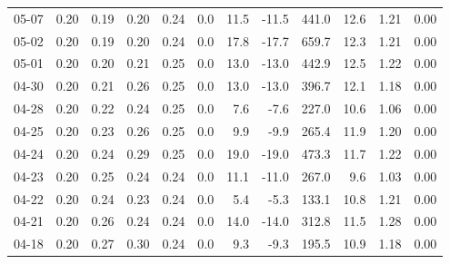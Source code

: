 \begin{threeparttable}
{\begin{tabular}{lrrrrrrrrrrr}
  05-07 &          0.20 &          0.19 &          0.20 &        0.24 &                 0.0 &                11.5 &      -11.5 &               441.0 &             12.6 &            1.21 &                   0.00 \\
  05-02 &          0.20 &          0.19 &          0.20 &        0.24 &                 0.0 &                17.8 &      -17.7 &               659.7 &             12.3 &            1.21 &                   0.00 \\
  05-01 &          0.20 &          0.20 &          0.21 &        0.25 &                 0.0 &                13.0 &      -13.0 &               442.9 &             12.5 &            1.22 &                   0.00 \\
  04-30 &          0.20 &          0.21 &          0.26 &        0.25 &                 0.0 &                13.0 &      -13.0 &               396.7 &             12.1 &            1.18 &                   0.00 \\
  04-28 &          0.20 &          0.22 &          0.24 &        0.25 &                 0.0 &                 7.6 &       -7.6 &               227.0 &             10.6 &            1.06 &                   0.00 \\
  04-25 &          0.20 &          0.23 &          0.26 &        0.25 &                 0.0 &                 9.9 &       -9.9 &               265.4 &             11.9 &            1.20 &                   0.00 \\
  04-24 &          0.20 &          0.24 &          0.29 &        0.25 &                 0.0 &                19.0 &      -19.0 &               473.3 &             11.7 &            1.22 &                   0.00 \\
  04-23 &          0.20 &          0.25 &          0.24 &        0.24 &                 0.0 &                11.1 &      -11.0 &               267.0 &              9.6 &            1.03 &                   0.00 \\
  04-22 &          0.20 &          0.24 &          0.23 &        0.24 &                 0.0 &                 5.4 &       -5.3 &               133.1 &             10.8 &            1.21 &                   0.00 \\
  04-21 &          0.20 &          0.26 &          0.24 &        0.24 &                 0.0 &                14.0 &      -14.0 &               312.8 &             11.5 &            1.28 &                   0.00 \\
  04-18 &          0.20 &          0.27 &          0.30 &        0.24 &                 0.0 &                 9.3 &       -9.3 &               195.5 &             10.9 &            1.18 &                   0.00 \\

\end{tabular}}
\end{threeparttable}
